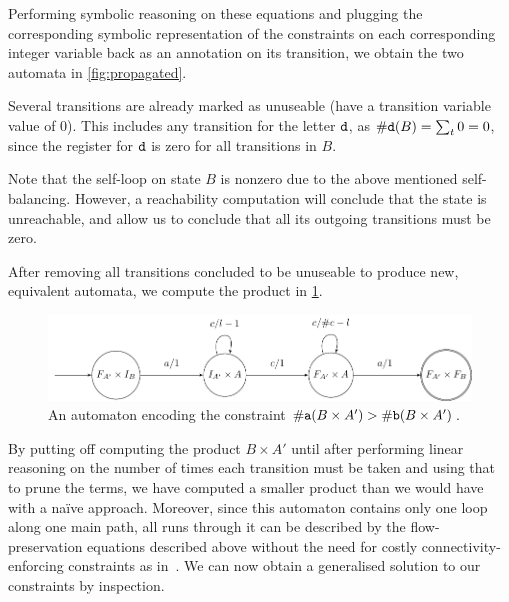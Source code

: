 Performing symbolic reasoning on these equations and plugging the corresponding
symbolic representation of the constraints on each corresponding integer
variable back as an annotation on its transition, we obtain the two automata in
\cref{fig:propagated}.


Several transitions are already marked as unuseable (have a transition variable
value of $0$). This includes any transition for the letter $\texttt{d}$, as
$\#\text{\texttt{d}}(B) = \sum_{t} 0 = 0$, since the register for
$\texttt{d}$ is zero for all transitions in $B$.

Note that the self-loop on state $B$ is nonzero due to the above mentioned
self-balancing. However, a reachability computation will conclude that the state
is unreachable, and allow us to conclude that all its outgoing transitions must
be zero.

After removing all transitions concluded to be unuseable to produce new,
equivalent automata, we compute the product in \cref{fig:product}.

\begin{figure}[h]
    \centering 
    \includegraphics[scale=\autscale]{ab}
  \caption{An automaton encoding the constraint $\#\text{\texttt{a}}(B \times A')
  > \#\text{\texttt{b}}(B \times A')$.}\label{fig:product}
\end{figure}

By putting off computing the product $B \times A'$ until after performing linear
reasoning on the number of times each transition must be taken and using that to
prune the terms, we have computed a smaller product than we would have with a
na\"ive approach. Moreover, since this automaton contains only one loop along
one main path, all runs through it can be described by the flow-preservation
equations described above without the need for costly connectivity-enforcing
constraints as in~\cite{generate-parikh-image}. We can now obtain a generalised
solution to our constraints by inspection.